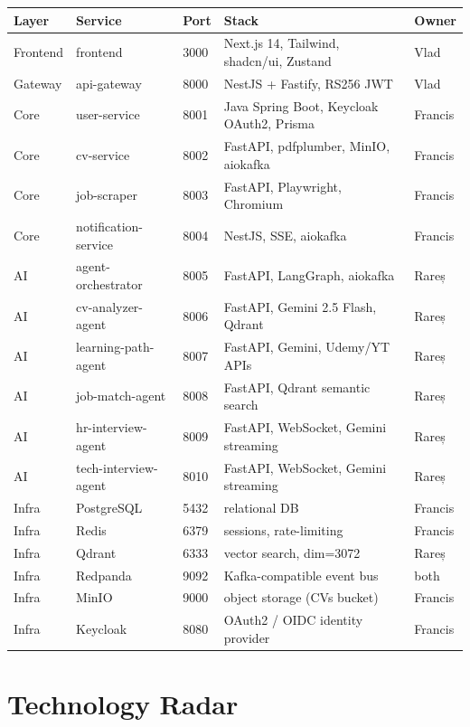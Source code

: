 \documentclass[12pt, a4paper]{report}
\begin{document}
\begin{center}
\begin{tabularx}{\textwidth}{lllXl}
\toprule
\rowcolor{primary!25}
\textbf{Layer} & \textbf{Service} & \textbf{Port} & \textbf{Stack} & \textbf{Owner} \\
\midrule
Frontend & frontend & 3000 & Next.js 14, Tailwind, shadcn/ui, Zustand & Vlad \\
Gateway & api-gateway & 8000 & NestJS + Fastify, RS256 JWT & Vlad \\
Core & user-service & 8001 & Java Spring Boot, Keycloak OAuth2, Prisma & Francis \\
Core & cv-service & 8002 & FastAPI, pdfplumber, MinIO, aiokafka & Francis \\
Core & job-scraper & 8003 & FastAPI, Playwright, Chromium & Francis \\
Core & notification-service & 8004 & NestJS, SSE, aiokafka & Francis \\
AI & agent-orchestrator & 8005 & FastAPI, LangGraph, aiokafka & Rareș \\
AI & cv-analyzer-agent & 8006 & FastAPI, Gemini 2.5 Flash, Qdrant & Rareș \\
AI & learning-path-agent & 8007 & FastAPI, Gemini, Udemy/YT APIs & Rareș \\
AI & job-match-agent & 8008 & FastAPI, Qdrant semantic search & Rareș \\
AI & hr-interview-agent & 8009 & FastAPI, WebSocket, Gemini streaming & Rareș \\
AI & tech-interview-agent & 8010 & FastAPI, WebSocket, Gemini streaming & Rareș \\
\midrule
Infra & PostgreSQL & 5432 & relational DB & Francis \\
Infra & Redis & 6379 & sessions, rate-limiting & Francis \\
Infra & Qdrant & 6333 & vector search, dim=3072 & Rareș \\
Infra & Redpanda & 9092 & Kafka-compatible event bus & both \\
Infra & MinIO & 9000 & object storage (CVs bucket) & Francis \\
Infra & Keycloak & 8080 & OAuth2 / OIDC identity provider & Francis \\
\bottomrule
\end{tabularx}
\end{center}

\section{Technology Radar}
\end{document}
